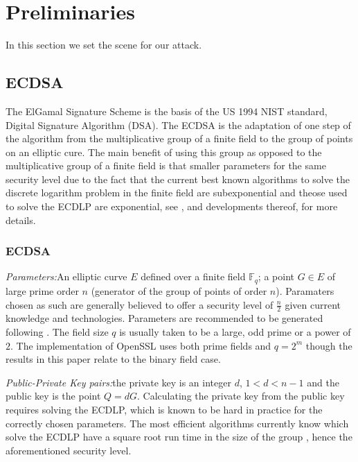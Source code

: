 \documentclass{llncs}
\newcommand{\F}{{\mathbb F}}
\begin{document}
\section{Preliminaries}\label{sec:background}
In this section we set the scene for our attack.

\subsection{ECDSA}\label{sub:ecdsa}

The ElGamal Signature Scheme \cite{Elgamal85} is the basis of the US 1994 NIST standard, Digital Signature Algorithm (DSA). The ECDSA is the adaptation of one step of the algorithm from the multiplicative group of a finite field to the group of points on an elliptic cure. The main benefit of using this group as opposed to the multiplicative group of a finite field is that smaller parameters for the same security level \cite{koblitz87elliptic,miller85use} due to the fact that the current best known algorithms to solve the discrete logarithm problem in the finite field are subexponential and theose used to solve the ECDLP are exponential, see \cite{balasubramanian-koblitz,adelman-demarrais}, and developments thereof, for more details. 
\subsubsection{ECDSA}
\emph{Parameters:}\quad An elliptic curve $E$ defined over a finite field $\F_{q}$; a point $G\in E$ of large prime order $n$ (generator of the group of points of order $n$). Paramaters chosen as such are generally believed to offer a security level of $\frac{n}{2}$ given current knowledge and technologies. Parameters are recommended to be generated following \cite{fips}. The field size $q$ is usually taken to be a large, odd prime or a power of $2$. The implementation of OpenSSL uses both prime fields and $q=2^m$ though the results in this paper relate to the binary field case.

\emph{Public-Private Key pairs:}\quad the private key is an integer $d$, $1<d<n-1$ and the public key is the point $Q=dG$. Calculating the private key from the public key requires solving the ECDLP, which is known to be hard in practice for the correctly chosen parameters. The most efficient algorithms currently know which solve the ECDLP have a square root run time in the size of the group \cite{WienerZ98,GallantLV00}, hence the aforementioned security level.
\vspace{0.5cm}
\end{document}
